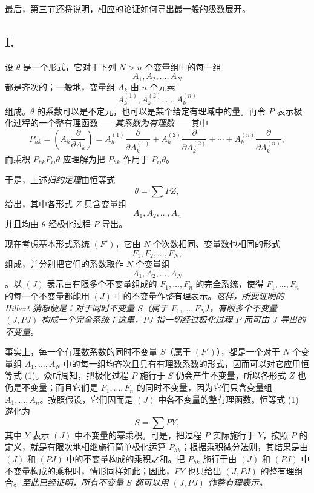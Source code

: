 最后，第三节还将说明，相应的论证如何导出最一般的级数展开。

\subsection*{I.}
设 $\theta$ 是一个形式，它对于下列 $N>n$ 个变量组中的每一组
\[
  A_1,A_2,\ldots,A_N
\]
都是齐次的；一般地，变量组 $A_k$ 由 $n$ 个元素
\[
  A_k^{(1)},A_k^{(2)},\ldots,A_k^{(n)}
\]
组成。$\theta$ 的系数可以是不定元，也可以是某个给定有理域中的量。再令 $P$ 表示极化过程的一个整有理函数——\emph{其系数为有理数}——其中
\[
  P_{hk}=\left(A_h\frac{\partial}{\partial A_k}\right)
  =A_h^{(1)}\frac{\partial}{\partial A_k^{(1)}}+
   A_h^{(2)}\frac{\partial}{\partial A_k^{(2)}}+
   \cdots+
   A_h^{(n)}\frac{\partial}{\partial A_k^{(n)}},
\]
而乘积 $P_{hk}P_{ij}\theta$ 应理解为把 $P_{hk}$ 作用于 $P_{ij}\theta$。

于是，上述\emph{归约定理}由恒等式
\begin{equation}
  \theta=\sum PZ,
\tag{1}
\end{equation}
给出，其中各形式 $Z$ 只含变量组
\[
  A_1,A_2,\ldots,A_n
\]
并且均由 $\theta$ 经极化过程 $P$ 导出。

现在考虑基本形式系统 $(F')$，它由 $N$ 个次数相同、变量数也相同的形式
\[
  F_1,F_2,\ldots,F_N,
\]
组成，并分别把它们的系数取作 $N$ 个变量组
\[
  A_1,A_2,\ldots,A_N
\]
。以 $(J)$ 表示由有限多个不变量组成的 $F_1,\ldots,F_n$ 的完全系统，使得 $F_1,\ldots,F_n$ 的每一个不变量都能用 $(J)$ 中的不变量作整有理表示。\emph{这样，所要证明的 Hilbert 猜想便是：对于同时不变量 $S$（属于 $F_1,\ldots,F_N$），有限多个不变量 $(J,PJ)$ 构成一个完全系统；这里，$PJ$ 指一切经过极化过程 $P$ 而可由 $J$ 导出的不变量。}

事实上，每一个有理数系数的同时不变量 $S$（属于 $(F')$），都是一个对于 $N$ 个变量组 $A_1,\ldots,A_N$ 中的每一组均齐次且具有有理数系数的形式，因而可以对它应用恒等式 (1)。众所周知，把极化过程 $P$ 施行于 $S$ 仍会产生不变量，所以各形式 $Z$ 也仍是不变量；而且它们是 $F_1,
\ldots,F_n$ 的同时不变量，因为它们只含变量组 $A_1,
\ldots,A_n$。按照假设，它们因而是 $(J)$ 中各不变量的整有理函数。恒等式 (1) 遂化为
\[
  S=\sum PY,
\]
其中 $Y$ 表示 $(J)$ 中不变量的幂乘积。可是，把过程 $P$ 实际施行于 $Y$，按照 $P$ 的定义，就是有限次地相继施行简单极化运算 $P_{hk}$；根据乘积微分法则，其结果是由 $(J)$ 和 $(PJ)$ 中的不变量构成的乘积之和。把 $P_{hk}$ 施行于由 $(J)$ 和 $(PJ)$ 中不变量构成的乘积时，情形同样如此；因此，$PY$ 也只给出 $(J,PJ)$ 的整有理组合。\emph{至此已经证明，所有不变量 $S$ 都可以用 $(J,PJ)$ 作整有理表示。}
